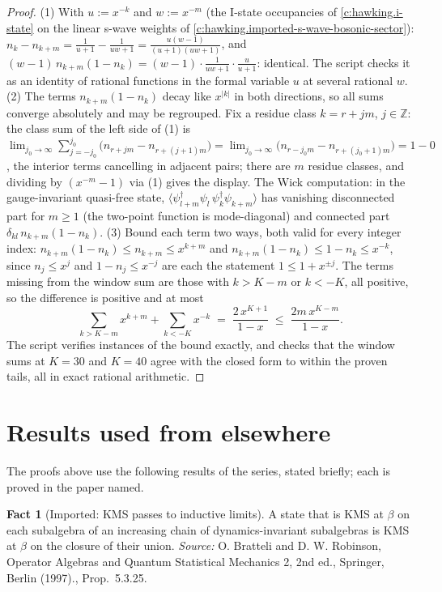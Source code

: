 \documentclass[11pt]{article}
\theoremstyle{definition}
\newtheorem{fact}[theorem]{Fact}
\theoremstyle{plain}
\providecommand{\Z}{}\renewcommand{\Z}{\mathbb{Z}}
\begin{document}
\begin{proof}
(1) With $u := x^{-k}$ and $w := x^{-m}$ (the I-state occupancies of \ref{c:hawking.i-state} on the linear s-wave weights of \ref{c:hawking.imported-s-wave-bosonic-sector}): $n_k - n_{k+m} = \tfrac{1}{u+1} - \tfrac{1}{uw+1} = \tfrac{u(w-1)}{(u+1)(uw+1)}$, and $(w-1)\,n_{k+m}(1-n_k) = (w-1)\cdot\tfrac{1}{uw+1}\cdot\tfrac{u}{u+1}$: identical. The script checks it as an identity of rational functions in the formal variable $u$ at several rational $w$.
(2) The terms $n_{k+m}(1 - n_k)$ decay like $x^{|k|}$ in both directions, so all sums converge absolutely and may be regrouped. Fix a residue class $k = r + jm$, $j \in \Z$: the class sum of the left side of (1) is $\lim_{j_0 \to \infty}\sum_{j=-j_0}^{j_0}\bigl(n_{r+jm} - n_{r+(j+1)m}\bigr) = \lim_{j_0 \to \infty}\bigl(n_{r-j_0 m} - n_{r+(j_0+1)m}\bigr) = 1 - 0$, the interior terms cancelling in adjacent pairs; there are $m$ residue classes, and dividing by $(x^{-m}-1)$ via (1) gives the display. The Wick computation: in the gauge-invariant quasi-free state, $\langle \psi^\dagger_{l+m}\psi_l\,\psi^\dagger_k\psi_{k+m}\rangle$ has vanishing disconnected part for $m \ge 1$ (the two-point function is mode-diagonal) and connected part $\delta_{kl}\,n_{k+m}(1 - n_k)$.
(3) Bound each term two ways, both valid for every integer index: $n_{k+m}(1-n_k) \le n_{k+m} \le x^{k+m}$ and $n_{k+m}(1-n_k) \le 1 - n_k \le x^{-k}$, since $n_j \le x^j$ and $1 - n_j \le x^{-j}$ are each the statement $1 \le 1 + x^{\pm j}$. The terms missing from the window sum are those with $k > K - m$ or $k < -K$, all positive, so the difference is positive and at most
\[
\sum_{k > K-m} x^{k+m} + \sum_{k < -K} x^{-k} \;=\; \frac{2\,x^{K+1}}{1-x} \;\le\; \frac{2m\,x^{K-m}}{1-x}.
\]
The script verifies instances of the bound exactly, and checks that the window sums at $K = 30$ and $K = 40$ agree with the closed form to within the proven tails, all in exact rational arithmetic.

\end{proof}

\section{Results used from elsewhere}
The proofs above use the following results of the series, stated briefly; each is proved in the paper named.

\begin{fact}[Imported: KMS passes to inductive limits]\label{c:hawking.imported-kms-passes-inductive-limits}
A state that is KMS at $\beta$ on each subalgebra of an increasing chain of dynamics-invariant subalgebras is KMS at $\beta$ on the closure of their union.
\emph{Source:} O. Bratteli and D. W. Robinson, Operator Algebras and Quantum Statistical Mechanics 2, 2nd ed., Springer, Berlin (1997)., Prop.~5.3.25.
\end{fact}
\end{document}
